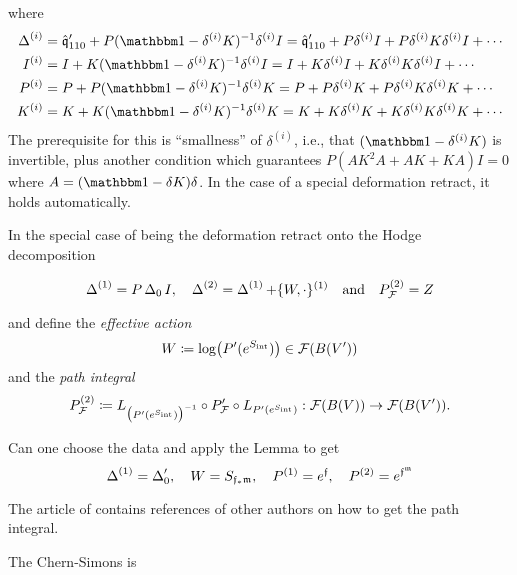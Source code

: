 \documentclass[\MainFolder/Text.tex]{subfiles}
\begin{document}
where
\begin{align*} 
 \BVOp^{(i)} &= \hat{\OPQ}_{110}' + P(\Id - \delta^{(i)}K)^{-1}\delta^{(i)} I = \hat{\OPQ}_{110}' + P \delta^{(i)} I + P \delta^{(i)} K \delta^{(i)} I + \dotsb  \\
 I^{(i)} &= I + K(\Id - \delta^{(i)}K)^{-1}\delta^{(i)} I = I + K \delta^{(i)} I + K \delta^{(i)} K \delta^{(i)} I + \dotsb \\
 P^{(i)} &= P + P(\Id-\delta^{(i)}K)^{-1}\delta^{(i)} K = P + P \delta^{(i)} K + P \delta^{(i)} K \delta^{(i)} K + \dotsb\\
 K^{(i)} &= K + K(\Id-\delta^{(i)}K)^{-1}\delta^{(i)}K = K + K\delta^{(i)} K + K \delta^{(i)} K \delta^{(i)} K + \dotsb
\end{align*}
The prerequisite for this is ``smallness'' of $\delta^{(i)}$, i.e., that $(\Id - \delta^{(i)} K)$ is invertible, plus another condition which guarantees $P(A K^2 A + A K + K A)I = 0$ where $A= (\Id - \delta K)\delta$. In the case of a special deformation retract, it holds automatically.

In the special case of being the deformation retract onto the Hodge decomposition 

$$ \operatorname{\Delta}^{(1)} = P\operatorname{\Delta}_0 I,\quad \operatorname{\Delta}^{(2)}=\operatorname{\Delta}^{(1)} + \{W,\cdot\}^{(1)}\quad\text{and}\quad P^{(2)}_{\mathcal{F}} = Z $$

and define the \emph{effective action} 
$$W \coloneqq \log\bigl(P'(e^{S_{\mathrm{int}}})\bigr) \in \mathcal{F}(B(V'))$$
and the \emph{path integral}
$$P^{(2)}_{\mathcal{F}} \coloneqq L_{\bigl(P'(e^{S_{\mathrm{int}}})\bigr)^{-1}} \circ P'_{\mathcal{F}} \circ L_{P'(e^{S_{\mathrm{int}}})}: \mathcal{F}(B(V)) \rightarrow \mathcal{F}(B(V')).$$


\begin{Question}
Can one choose the data and apply the Lemma to get
$$ \operatorname{\Delta}^{(1)} = \operatorname{\Delta}_0', \quad W = S_{\mathfrak{f}_* \mathfrak{m}},\quad P^{(1)} = e^{\mathfrak{f}},\quad P^{(2)}= e^{\mathfrak{f}^{\mathfrak{m}}} $$
\end{Question}


The article of \cite{Doubek2018} contains references of other authors on how to get the path integral.

The Chern-Simons is 
\end{document}
